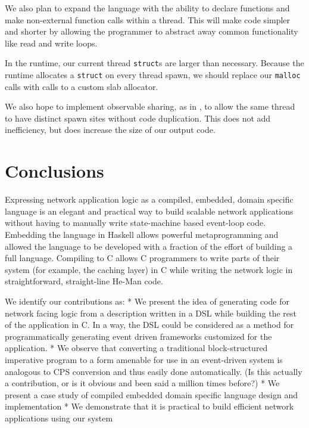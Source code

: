 \documentclass[preprint]{sigplanconf}
\renewcommand{\t}{\texttt}
\begin{document}
We also plan to expand the language with the ability to declare functions and
make non-external function calls within a thread. This will make code simpler
and shorter by allowing the programmer to abstract away common functionality
like read and write loops.

In the runtime, our current thread \t{struct}s are larger than necessary.
Because the runtime allocates a \t{struct} on every thread spawn, we should
replace our \t{malloc} calls with calls to a custom slab allocator.

We also hope to implement observable sharing, as in \cite{Gill}, to allow the
same thread to have distinct spawn sites without code duplication. This does not
add inefficiency, but does increase the size of our output code. 

\section{Conclusions}
Expressing network application logic as a compiled, embedded, domain
specific language is an elegant and practical way to build scalable
network applications without having to manually write state-machine
based event-loop code. Embedding the language in Haskell allows
powerful metaprogramming and allowed the language to be developed with
a fraction of the effort of building a full language. Compiling to C
allows C programmers to write parts of their system (for example, the
caching layer) in C while writing the network logic in
straightforward, straight-line He-Man code.


We identify our contributions as:
* We present the idea of generating code for network facing logic from a
description written in a DSL while building the rest of the application in
C. In a way, the DSL could be considered as a method for programmatically
generating event driven frameworks customized for the application.
* We observe that converting a traditional block-structured imperative
program to a form amenable for use in an event-driven system is analogous
to CPS conversion and thus easily done automatically. (Is this actually a
contribution, or is it obvious and been said a million times before?)
* We present a case study of compiled embedded domain specific language
design and implementation
* We demonstrate that it is practical to build efficient network
applications using our system

{}

\end{document}
